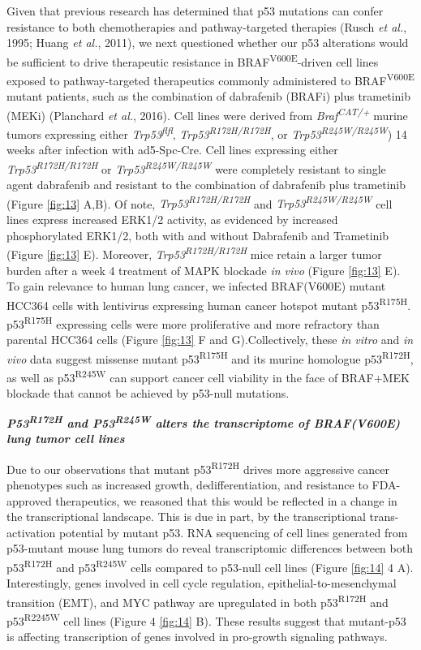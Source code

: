 Given that previous research has determined that p53 mutations can confer resistance to both chemotherapies and pathway-targeted therapies (Rusch \emph{et al.}, 1995; Huang \emph{et al.}, 2011), we next questioned whether our p53 alterations would be sufficient to drive therapeutic resistance in BRAF\textsuperscript{V600E}-driven cell lines exposed to pathway-targeted therapeutics commonly administered to BRAF\textsuperscript{V600E} mutant patients, such as the combination of dabrafenib (BRAFi) plus trametinib (MEKi) (Planchard \emph{et al.}, 2016). Cell lines were derived from \emph{Braf\textsuperscript{CAT/+}} murine tumors expressing either \emph{Trp53\textsuperscript{flfl}}, \emph{Trp53\textsuperscript{R172H/R172H}}, or \emph{Trp53\textsuperscript{R245W/R245W}}) 14 weeks after infection with ad5-Spc-Cre. Cell lines expressing either \emph{Trp53\textsuperscript{R172H/R172H}} or \emph{Trp53\textsuperscript{R245W/R245W}} were completely resistant to single agent dabrafenib and resistant to the combination of dabrafenib plus trametinib (Figure \ref{fig:13} A,B). Of note, \emph{Trp53\textsuperscript{R172H/R172H}} and \emph{Trp53\textsuperscript{R245W/R245W}} cell lines express increased ERK1/2 activity, as evidenced by increased phosphorylated ERK1/2, both with and without Dabrafenib and Trametinib (Figure \ref{fig:13} E). Moreover, \emph{Trp53\textsuperscript{R172H/R172H}} mice retain a larger tumor burden after a week 4 treatment of MAPK blockade \emph{in vivo} (Figure \ref{fig:13} E). To gain relevance to human lung cancer, we infected BRAF(V600E) mutant HCC364 cells with lentivirus expressing human cancer hotspot mutant p53\textsuperscript{R175H}. p53\textsuperscript{R175H} expressing cells were more proliferative and more refractory than parental HCC364 cells (Figure \ref{fig:13} F and G).Collectively, these \emph{in vitro} and \emph{in vivo} data suggest missense mutant p53\textsuperscript{R175H} and its murine homologue p53\textsuperscript{R172H}, as well as p53\textsuperscript{R245W} can support cancer cell viability in the face of BRAF+MEK blockade that cannot be achieved by p53-null mutations.

\emph{\textbf{P53\textsuperscript{R172H} and P53\textsuperscript{R245W} alters the transcriptome of BRAF(V600E) lung tumor cell lines}}

Due to our observations that mutant p53\textsuperscript{R172H} drives more aggressive cancer phenotypes such as increased growth, dedifferentiation, and resistance to FDA-approved therapeutics, we reasoned that this would be reflected in a change in the transcriptional landscape. This is due in part, by the transcriptional trans-activation potential by mutant p53. RNA sequencing of cell lines generated from p53-mutant mouse lung tumors do reveal transcriptomic differences between both p53\textsuperscript{R172H} and p53\textsuperscript{R245W} cells compared to p53-null cell lines (Figure \ref{fig:14} 4 A). Interestingly, genes involved in cell cycle regulation, epithelial-to-mesenchymal transition (EMT), and MYC pathway are upregulated in both p53\textsuperscript{R172H} and p53\textsuperscript{R2245W} cell lines (Figure 4 \ref{fig:14} B). These results suggest that mutant-p53 is affecting transcription of genes involved in pro-growth signaling pathways.

